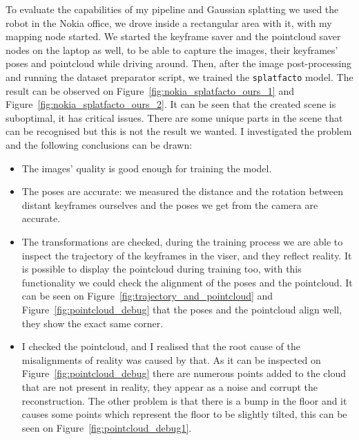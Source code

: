 

To evaluate the capabilities of my pipeline and Gaussian splatting we used the robot in the Nokia office, we drove inside a rectangular area with it, with my mapping node started. We started the keyframe saver and the pointcloud saver nodes on the laptop as well, to be able to capture the images, their keyframes' poses and pointcloud while driving around. Then, after the image post-processing and running the dataset preparator script, we trained the \verb|splatfacto| model. The result can be observed on Figure~\ref{fig:nokia_splatfacto_ours_1} and Figure~\ref{fig:nokia_splatfacto_ours_2}. It can be seen that the created scene is suboptimal, it has critical issues. There are some unique parts in the scene that can be recognised but this is not the result we wanted. I investigated the problem and the following conclusions can be drawn:
\begin{itemize}
    \item The images' quality is good enough for training the model.
    \item The poses are accurate: we measured the distance and the rotation between distant keyframes ourselves and the poses we get from the camera are accurate.
    \item The transformations are checked, during the training process we are able to inspect the trajectory of the keyframes in the viser, and they reflect reality. It is possible to display the pointcloud during training too, with this functionality we could check the alignment of the poses and the pointcloud. It can be seen on Figure~\ref{fig:trajectory_and_pointcloud} and Figure~\ref{fig:pointcloud_debug} that the poses and the pointcloud align well, they show the exact same corner.
    \item I checked the pointcloud, and I realised that the root cause of the misalignments of reality was caused by that. As it can be inspected on Figure~\ref{fig:pointcloud_debug} there are numerous points added to the cloud that are not present in reality, they appear as a noise and corrupt the reconstruction. The other problem is that there is a bump in the floor and it causes some points which represent the floor to be slightly tilted, this can be seen on Figure~\ref{fig:pointcloud_debug1}.
\end{itemize}

